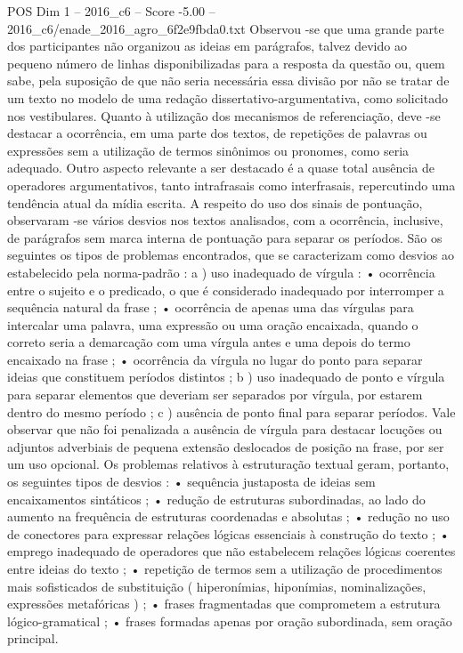 \begin{textsample}{POS Dim 1 – 2016\_c6 – Score -5.00 – 2016\_c6/enade\_2016\_agro\_6f2e9fbda0.txt}
Observou -se que uma grande parte dos participantes não organizou as ideias em parágrafos, talvez devido ao pequeno número de linhas disponibilizadas para a resposta da questão ou, quem sabe, pela suposição de que não seria necessária essa divisão por não se tratar de um texto no modelo de uma redação dissertativo-argumentativa, como solicitado nos vestibulares.
Quanto à utilização dos mecanismos de referenciação, deve -se destacar a ocorrência, em uma parte dos textos, de repetições de palavras ou expressões sem a utilização de termos sinônimos ou pronomes, como seria adequado.
Outro aspecto relevante a ser destacado é a quase total ausência de operadores argumentativos, tanto intrafrasais como interfrasais, repercutindo uma tendência atual da mídia escrita.
A respeito do uso dos sinais de pontuação, observaram -se vários desvios nos textos analisados, com a ocorrência, inclusive, de parágrafos sem marca interna de pontuação para separar os períodos.
São os seguintes os tipos de problemas encontrados, que se caracterizam como desvios ao estabelecido pela norma-padrão : a ) uso inadequado de vírgula : • ocorrência entre o sujeito e o predicado, o que é considerado inadequado por interromper a sequência natural da frase ; • ocorrência de apenas uma das vírgulas para intercalar uma palavra, uma expressão ou uma oração encaixada, quando o correto seria a demarcação com uma vírgula antes e uma depois do termo encaixado na frase ; • ocorrência da vírgula no lugar do ponto para separar ideias que constituem períodos distintos ; b ) uso inadequado de ponto e vírgula para separar elementos que deveriam ser separados por vírgula, por estarem dentro do mesmo período ; c ) ausência de ponto final para separar períodos.
Vale observar que não foi penalizada a ausência de vírgula para destacar locuções ou adjuntos adverbiais de pequena extensão deslocados de posição na frase, por ser um uso opcional.
Os problemas relativos à estruturação textual geram, portanto, os seguintes tipos de desvios : • sequência justaposta de ideias sem encaixamentos sintáticos ; • redução de estruturas subordinadas, ao lado do aumento na frequência de estruturas coordenadas e absolutas ; • redução no uso de conectores para expressar relações lógicas essenciais à construção do texto ; • emprego inadequado de operadores que não estabelecem relações lógicas coerentes entre ideias do texto ; • repetição de termos sem a utilização de procedimentos mais sofisticados de substituição ( hiperonímias, hiponímias, nominalizações, expressões metafóricas ) ; • frases fragmentadas que comprometem a estrutura lógico-gramatical ; • frases formadas apenas por oração subordinada, sem oração principal.

\end{textsample}

